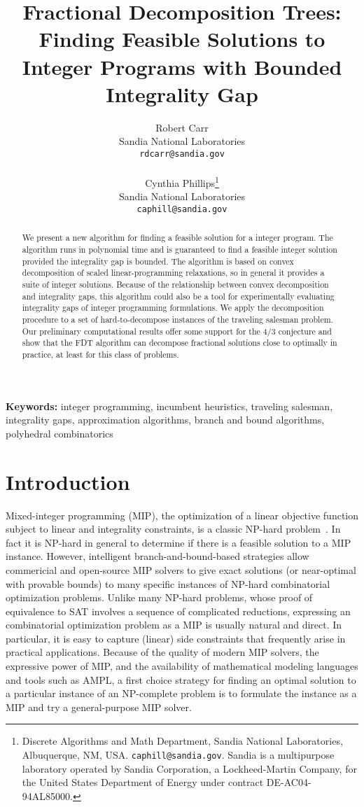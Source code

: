 \documentclass[11pt]{article}
\date {}
\title{Fractional Decomposition Trees: Finding Feasible Solutions to Integer Programs with Bounded Integrality Gap}
\author{
\parbox[t]{6cm}{\centering
Robert Carr\\
\small{{Sandia National Laboratories\\{\tt rdcarr@sandia.gov}}}\\
}
\parbox[t]{6cm}{\centering
Cynthia Phillips\thanks{
Discrete Algorithms and Math Department, Sandia National Laboratories, Albuquerque, NM, USA.
\texttt{caphill@sandia.gov}.
Sandia is a multipurpose laboratory
operated by Sandia Corporation, a Lockheed-Martin Company, for the
United States Department of Energy under contract DE-AC04-94AL85000.
}\\
\small{{Sandia National Laboratories\\{\tt caphill@sandia.gov}}}\\
}
}%
\begin{document}

\maketitle

\thispagestyle{empty}
\setcounter{page}{0}

\begin{abstract}
We present a new algorithm for finding a feasible solution for a
integer program. The algorithm runs in polynomial time and is
guaranteed to find a feasible integer solution provided the
integrality gap is bounded.  The algorithm is based on convex
decomposition of scaled linear-programming relaxations, so in general
it provides a suite of integer solutions.  Because of the relationship
between convex decomposition and integrality gaps, this algorithm
could also be a tool for experimentally evaluating integrality gaps of
integer programming formulations.  We apply the decomposition
procedure to a set of hard-to-decompose instances of the traveling
salesman problem.  Our preliminary computational results offer some
support for the $4/3$ conjecture and show that the FDT algorithm can
decompose fractional solutions close to optimally in practice, at
least for this class of problems.
\end{abstract}

{\bf Keywords:} integer programming, incumbent heuristics, traveling salesman, integrality gaps, approximation algorithms, branch and bound algorithms, polyhedral combinatorics

\newpage

\section{Introduction}

Mixed-integer programming (MIP), the optimization of a linear
objective function subject to linear and integrality constraints, is a
classic NP-hard problem~\cite{GJ79}.  In fact it is NP-hard in general
to determine if there is a feasible solution to a MIP
instance\cite{GJ79}.  However, intelligent branch-and-bound-based
strategies allow commericial and open-source MIP solvers to give exact
solutions (or near-optimal with provable bounds) to many specific
instances of NP-hard combinatorial optimization problems.  Unlike many
NP-hard problems, whose proof of equivalence to SAT involves a
sequence of complicated reductions, expressing an combinatorial
optimization problem as a MIP is usually natural and direct.  In
particular, it is easy to capture (linear) side constraints that
frequently arise in practical applications.  Because of the quality of
modern MIP solvers, the expressive power of MIP, and the availability
of mathematical modeling languages and tools such as AMPL\cite{ampl},
a first choice strategy for finding an optimal solution to a
particular instance of an NP-complete problem is to formulate the
instance as a MIP and try a general-purpose MIP solver.
\end{document}
